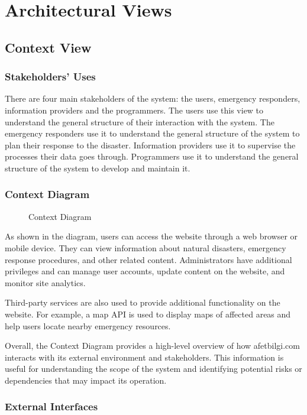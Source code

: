 \documentclass[a4paper]{article}
\begin{document}
    \section{Architectural Views}
    \subsection{Context View}
    \subsubsection{Stakeholders' Uses}
    There are four main stakeholders of the system: the users, emergency responders, information providers and the programmers.
    The users use this view to understand the general structure of their interaction with the system. The emergency responders
    use it to understand the general structure of the system to plan their response to the disaster. Information providers use it
    to supervise the processes their data goes through. Programmers use it to understand the general structure of the system to
    develop and maintain it.
    \subsubsection{Context Diagram}
    \begin{figure}
    
    \caption{Context Diagram}
    \end{figure}
        As shown in the diagram, users can access the website through a web browser or mobile device. They can view information about
        natural disasters, emergency response procedures, and other related content. Administrators have additional privileges and can
        manage user accounts, update content on the website, and monitor site analytics.

        Third-party services are also used to provide additional functionality on the website. For example, a map API is used to
        display maps of affected areas and help users locate nearby emergency resources.

        Overall, the Context Diagram provides a high-level overview of how afetbilgi.com interacts with its external environment and
        stakeholders. This information is useful for understanding the scope of the system and identifying potential risks or
        dependencies that may impact its operation.

    \subsubsection{External Interfaces}
    \lipsum[1-1]
\end{document}
